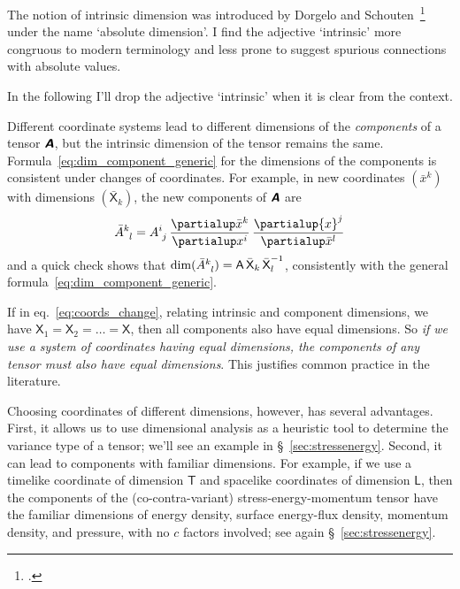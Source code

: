 \documentclass[\ifafour a4paper,12pt,\else a5paper,10pt,\fi%
onecolumn,oneside,article,%
british%
]{memoir}
\newcommand*{\defquote}[1]{`#1'}
\theoremstyle{remark}
\theoremstyle{innote}
\newcommand*{\mathte}[1]{\textbf{\textit{\textsf{#1}}}}
\newcommand*{\citep}{\footcites}
\newcommand*{\de}{\partialup}%
\renewcommand*{\|}[1][]{\nonscript\,#1\vert\nonscript\;\mathopen{}}
\newcommand*{\sect}{\S}%
\newcommand*{\chap}{ch.}%
\newcommand*{\eqn}{eq.}%
\newcommand*{\Le}{\textsf{L}}
\newcommand*{\Ti}{\textsf{T}}
\newcommand*{\Xx}{\textsf{X}}
\newcommand*{\Aa}{\textsf{A}}
\newcommand*{\yA}{\mathte{A}}
\renewcommand*{\i}{\indices}
\begin{document}
The notion of intrinsic dimension was introduced by Dorgelo and
Schouten~\citep{dorgeloetal1946}[\chap~VI]{schouten1951_r1989} under the
name \defquote{absolute dimension}. I find the adjective
\defquote{intrinsic} more congruous to modern terminology and less prone to
suggest spurious connections with absolute values.

In the following I'll drop the adjective \defquote{intrinsic} when it is
clear from the context.



\medskip

Different coordinate systems lead to different dimensions of the
\emph{components} of a tensor $\yA$, but the intrinsic dimension of the
tensor remains the same. Formula~\eqref{eq:dim_component_generic} for the
dimensions of the components is consistent under changes of coordinates.
For example, in new coordinates $({\bar{x}}^{k})$ with dimensions
$({\bar{\Xx}}_{k})$, the new components of $\yA$ are
\begin{equation}
  \label{eq:coords_change}
  \bar{A}\i{^{k}_{l}} = A\i{^{i}_{j}}
  \,\frac{\de \bar{x}^{k}}{\de x^{i}}
  \,\frac{\de {x}^{j}}{\de \bar{x}^{l}}
\end{equation}
and a quick check shows that
$\dim(\bar{A}\i{^{k}_{l}}) = \Aa\,\bar{\Xx}_{k}\,{\bar{\Xx}_{l}}^{-1}$, consistently
with the general formula~\eqref{eq:dim_component_generic}. %


\medskip

If in \eqn~\eqref{eq:coords_change}, relating intrinsic and component
dimensions, we have $\Xx_{1}=\Xx_{2}= \dotso =\Xx$, then all components
also have equal dimensions. So \emph{if we use a system of coordinates
  having equal dimensions, the components of any tensor must also have
  equal dimensions}. This justifies common practice in the literature.

Choosing coordinates of different dimensions, however, has several
advantages. First, it allows us to use dimensional analysis as a heuristic
tool to determine the variance type of a tensor; we'll see an example in
\sect~\ref{sec:stressenergy}. Second, it can lead to components with
familiar dimensions. For example, if we use a timelike coordinate of
dimension $\Ti$ and spacelike coordinates of dimension $\Le$, then the
components of the (co-contra-variant) stress-energy-momentum tensor have
the familiar dimensions of energy density, surface energy-flux density,
momentum density, and pressure, with no $c$ factors involved; see again
\sect~\ref{sec:stressenergy}.
\end{document}
